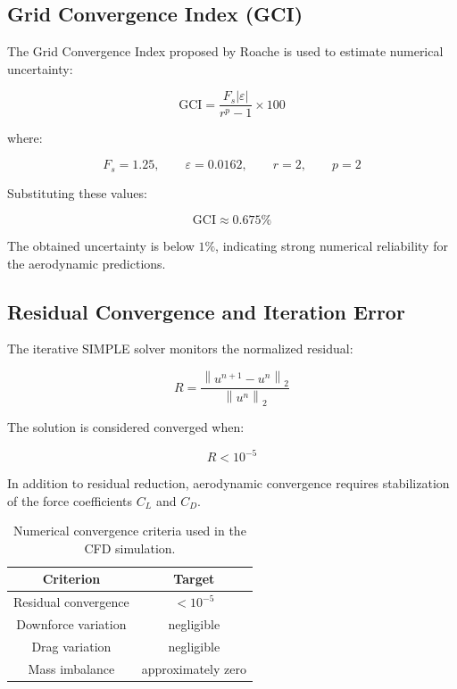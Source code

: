 \documentclass[12pt,a4paper]{article}
\begin{document}
\subsection{Grid Convergence Index (GCI)}

The Grid Convergence Index proposed by Roache is used to estimate numerical uncertainty:

\begin{equation}
    \text{GCI}
    =
    \frac{
    F_s |\varepsilon|
    }{
    r^p - 1
    }
    \times 100
\end{equation}

where:

\begin{equation}
    F_s = 1.25,
    \qquad
    \varepsilon = 0.0162,
    \qquad
    r = 2,
    \qquad
    p = 2
\end{equation}

Substituting these values:

\begin{equation}
    \text{GCI}
    \approx
    0.675\%
\end{equation}

The obtained uncertainty is below \(1\%\), indicating strong numerical reliability for
the aerodynamic predictions.

\subsection{Residual Convergence and Iteration Error}

The iterative SIMPLE solver monitors the normalized residual:

\begin{equation}
    R
    =
    \frac{
    \left\|
    u^{n+1}
    -
    u^n
    \right\|_2
    }{
    \left\|
    u^n
    \right\|_2
    }
\end{equation}

The solution is considered converged when:

\begin{equation}
    R < 10^{-5}
\end{equation}

In addition to residual reduction, aerodynamic convergence requires stabilization of the
force coefficients \(C_L\) and \(C_D\).

\begin{table}[H]
\centering
\caption{Numerical convergence criteria used in the CFD simulation.}
\begin{tabular}{cc}
\toprule
\textbf{Criterion} & \textbf{Target} \\
\midrule
Residual convergence & \(<10^{-5}\) \\
Downforce variation & negligible \\
Drag variation & negligible \\
Mass imbalance & approximately zero \\
\bottomrule
\end{tabular}
\end{table}
\end{document}
